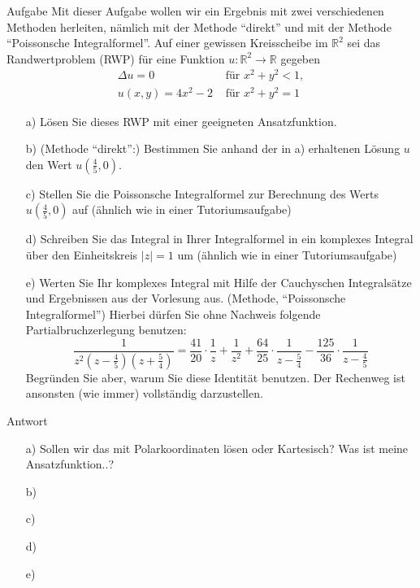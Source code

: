 \documentclass{scrartcl}
\begin{document}
\begin{section}{Aufgabe}
Mit dieser Aufgabe wollen wir ein Ergebnis mit zwei verschiedenen Methoden herleiten,
nämlich mit der Methode \enquote{direkt} und mit der Methode \enquote{Poissonsche Integralformel}.
Auf einer gewissen Kreisscheibe im \( \mathbb{R}^{2} \) sei das Randwertproblem (RWP) für eine Funktion \( u: \mathbb{R}^{2} \rightarrow \mathbb{R} \) gegeben 
\[ \begin{array}{ll} \Delta u=0 & \text { für } x^{2}+y^{2}<1, \\ u(x, y)=4 x^{2}-2 & \text { für } x^{2}+y^{2}=1 \end{array} \] 
\begin{itemize}
\item[a)]Lösen Sie dieses RWP mit einer geeigneten Ansatzfunktion. 
\item[b)] (Methode \enquote{direkt}:) Bestimmen Sie anhand der in a) erhaltenen Lösung \( u \) den Wert \( u\left(\frac{4}{5}, 0\right) \). 
\item[c)] Stellen Sie die Poissonsche Integralformel zur Berechnung des Werts \( u\left(\frac{4}{5}, 0\right) \) auf (ähnlich wie in einer Tutoriumsaufgabe) 
\item[d)] Schreiben Sie das Integral in Ihrer Integralformel in ein komplexes Integral über den Einheitskreis \( |z|=1 \) um (ähnlich wie in einer Tutoriumsaufgabe) 
\item[e)]  Werten Sie Ihr komplexes Integral mit Hilfe der Cauchyschen Integralsätze und Ergebnissen aus der Vorlesung aus. (Methode, \enquote{Poissonsche Integralformel}) Hierbei dürfen Sie ohne Nachweis folgende Partialbruchzerlegung benutzen: \[ \frac{1}{z^{2}\left(z-\frac{4}{5}\right)\left(z+\frac{5}{4}\right)}=\frac{41}{20} \cdot \frac{1}{z}+\frac{1}{z^{2}}+\frac{64}{25} \cdot 
\frac{1}{z-\frac{5}{4}}-\frac{125}{36} \cdot \frac{1}{z-\frac{4}{5}}\]
Begründen Sie aber, warum Sie diese Identität benutzen. Der Rechenweg ist ansonsten (wie immer) vollständig darzustellen.
\end{itemize}


      \begin{subsection}{Antwort}
\begin{itemize}
\item[a)] Sollen wir das mit Polarkoordinaten lösen oder Kartesisch? Was ist meine Ansatzfunktion..?
\item[b)] 
\item[c)]  
\item[d)] 
\item[e)] 
\end{itemize}
    \end{subsection}  
\end{section}
\end{document}

